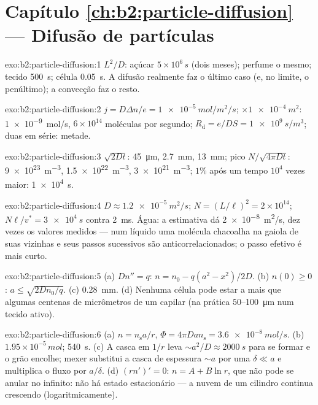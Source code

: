 \section*{Capítulo \ref{ch:b2:particle-diffusion} --- Difusão de partículas}

\begin{solution}{exo:b2:particle-diffusion:1}
$L^2/D$: açúcar $5 \times 10^6\,\unit{s}$ (dois meses); perfume o mesmo;
tecido \qty{500}{s}; célula \qty{0.05}{s}. A difusão realmente faz o
último caso (e, no limite, o penúltimo); a convecção faz o resto.
\end{solution}

\begin{solution}{exo:b2:particle-diffusion:2}
$j = D\Delta n/e = \qty{1e-5}{mol/m^2/s}$; $\times \qty{1e-4}{m^2}$:
\qty{1e-9}{mol/s}, $6 \times 10^{14}$ moléculas por segundo;
$R_{\text{d}} = e/DS = \qty{1e9}{s/m^3}$; duas em série: metade.
\end{solution}

\begin{solution}{exo:b2:particle-diffusion:3}
$\sqrt{2Dt}$: \qty{45}{\micro m}, \qty{2.7}{mm}, \qty{13}{mm}; pico $N/\sqrt{4\pi
Dt}$: \qty{9e23}{m^{-3}}, \qty{1.5e22}{m^{-3}}, \qty{3e21}{m^{-3}}; $1\%$
após um tempo $10^4$ vezes maior: \qty{1e4}{s}.
\end{solution}

\begin{solution}{exo:b2:particle-diffusion:4}
$D \approx \qty{1.2e-5}{m^2/s}$; $N = (L/\ell)^2 = 2 \times 10^{14}$; $N\ell/v^*
= \qty{3e4}{s}$ contra \qty{2}{ms}. Água: a estimativa dá
\qty{2e-8}{m^2/s}, dez vezes os valores medidos --- num líquido uma
molécula chacoalha na gaiola de suas vizinhas e seus passos sucessivos
são anticorrelacionados; o passo efetivo é mais curto.
\end{solution}

\begin{solution}{exo:b2:particle-diffusion:5}
(a) $Dn'' = q$: $n = n_0 - q(a^2 - x^2)/2D$. (b) $n(0) \ge 0$: $a \le
\sqrt{2Dn_0/q}$. (c) \qty{0.28}{mm}. (d) Nenhuma célula pode estar a mais que
algumas centenas de micrômetros de um capilar (na prática $50$--\qty{100}{\micro m}
num tecido ativo).
\end{solution}

\begin{solution}{exo:b2:particle-diffusion:6}
(a) $n = n_{\text{s}}a/r$, $\Phi = 4\pi D a n_{\text{s}} = \qty{3.6e-8}{mol/s}$.
(b) $1.95 \times 10^{-5}\,\unit{mol}$; \qty{540}{s}. (c) A casca em $1/r$ leva
$\sim a^2/D \approx \qty{2000}{s}$ para se formar e o grão encolhe; mexer
substitui a casca de espessura $\sim a$ por uma  $\delta \ll a$
e multiplica o fluxo por $a/\delta$. (d) $(rn')' = 0$: $n = A + B\ln r$,
que não pode se anular no infinito: não há estado estacionário --- a nuvem de um
cilindro continua crescendo (logaritmicamente).
\end{solution}

